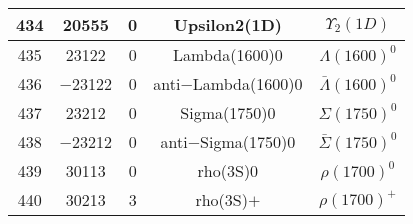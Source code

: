 \documentclass{article}
\begin{document}
\begin{table}[!htbp]
\begin{tabular}{|c|c|c|c|c|}
\hline
434 & 20555 & 0 & Upsilon\underline{\hspace{0.6em}}2(1D) & $\Upsilon_{2}(1D)$ \\
\hline
435 & 23122 & 0 & Lambda(1600)0 & $\Lambda(1600)^{0}$ \\
\hline
436 & $-$23122 & 0 & anti$-$Lambda(1600)0 & $\bar{\Lambda}(1600)^{0}$ \\
\hline
437 & 23212 & 0 & Sigma(1750)0 & $\Sigma(1750)^{0}$ \\
\hline
438 & $-$23212 & 0 & anti$-$Sigma(1750)0 & $\bar{\Sigma}(1750)^{0}$ \\
\hline
439 & 30113 & 0 & rho(3S)0 & $\rho(1700)^{0}$ \\
\hline
440 & 30213 & 3 & rho(3S)$+$ & $\rho(1700)^{+}$ \\
\hline
\end{tabular}
\end{table}

\clearpage
\end{document}

